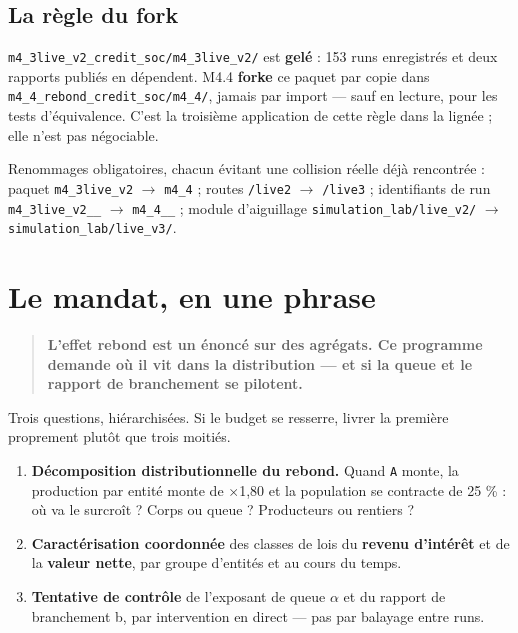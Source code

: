 \documentclass[11pt,a4paper]{article}
\newcommand{\code}[1]{\texttt{#1}}
\begin{document}
\subsection*{La règle du fork}

\code{m4\_3live\_v2\_credit\_soc/m4\_3live\_v2/} est \textbf{gelé} : 153 runs enregistrés et deux rapports publiés en dépendent. M4.4 \textbf{forke} ce paquet par copie dans \code{m4\_4\_rebond\_credit\_soc/m4\_4/}, jamais par import --- sauf en lecture, pour les tests d'équivalence. C'est la troisième application de cette règle dans la lignée ; elle n'est pas négociable.

Renommages obligatoires, chacun évitant une collision réelle déjà rencontrée : paquet \code{m4\_3live\_v2} \ensuremath{\rightarrow} \code{m4\_4} ; routes \code{/live2} \ensuremath{\rightarrow} \code{/live3} ; identifiants de run \code{m4\_3live\_v2\_\_} \ensuremath{\rightarrow} \code{m4\_4\_\_} ; module d'aiguillage \code{simulation\_lab/live\_v2/} \ensuremath{\rightarrow} \code{simulation\_lab/live\_v3/}.

\bigskip

\setcounter{section}{0}
\section{Le mandat, en une phrase}

\begin{quote}
\textbf{L'effet rebond est un énoncé sur des agrégats. Ce programme demande où il vit dans la distribution --- et si la queue et le rapport de branchement se pilotent.}
\end{quote}

Trois questions, hiérarchisées. Si le budget se resserre, livrer la première proprement plutôt que trois moitiés.

\begin{enumerate}
\item \textbf{Décomposition distributionnelle du rebond.} Quand \code{A} monte, la production par entité monte de \ensuremath{\times}1,80 et la population se contracte de 25 \% : où va le surcroît ? Corps ou queue ? Producteurs ou rentiers ?
\item \textbf{Caractérisation coordonnée} des classes de lois du \textbf{revenu d'intérêt} et de la \textbf{valeur nette}, par groupe d'entités et au cours du temps.
\item \textbf{Tentative de contrôle} de l'exposant de queue \ensuremath{\alpha} et du rapport de branchement b, par intervention en direct --- pas par balayage entre runs.
\end{enumerate}
\end{document}

